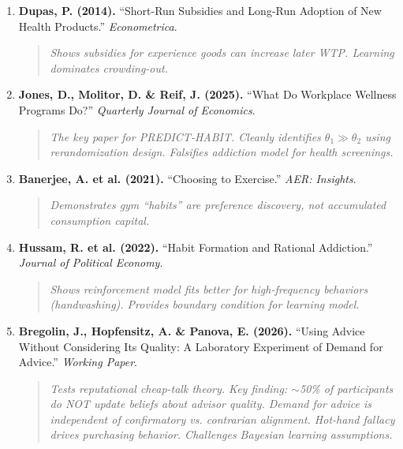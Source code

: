 \documentclass[11pt, a4paper]{article}
\begin{document}
\begin{enumerate}[resume]

\item \textbf{Dupas, P. (2014).} ``Short-Run Subsidies and Long-Run Adoption of New Health Products.'' \textit{Econometrica}.
\begin{quote}
\textit{Shows subsidies for experience goods can increase later WTP. Learning dominates crowding-out.}
\end{quote}

\item \textbf{Jones, D., Molitor, D. \& Reif, J. (2025).} ``What Do Workplace Wellness Programs Do?'' \textit{Quarterly Journal of Economics}.
\begin{quote}
\textit{The key paper for PREDICT-HABIT. Cleanly identifies $\theta_1 \gg \theta_2$ using rerandomization design. Falsifies addiction model for health screenings.}
\end{quote}

\item \textbf{Banerjee, A. et al. (2021).} ``Choosing to Exercise.'' \textit{AER: Insights}.
\begin{quote}
\textit{Demonstrates gym ``habits'' are preference discovery, not accumulated consumption capital.}
\end{quote}

\item \textbf{Hussam, R. et al. (2022).} ``Habit Formation and Rational Addiction.'' \textit{Journal of Political Economy}.
\begin{quote}
\textit{Shows reinforcement model fits better for high-frequency behaviors (handwashing). Provides boundary condition for learning model.}
\end{quote}

\item \textbf{Bregolin, J., Hopfensitz, A. \& Panova, E. (2026).} ``Using Advice Without Considering Its Quality: A Laboratory Experiment of Demand for Advice.'' \textit{Working Paper}.
\begin{quote}
\textit{Tests reputational cheap-talk theory. Key finding: $\sim$50\% of participants do NOT update beliefs about advisor quality. Demand for advice is independent of confirmatory vs. contrarian alignment. Hot-hand fallacy drives purchasing behavior. Challenges Bayesian learning assumptions.}
\end{quote}

\end{enumerate}
\end{document}
